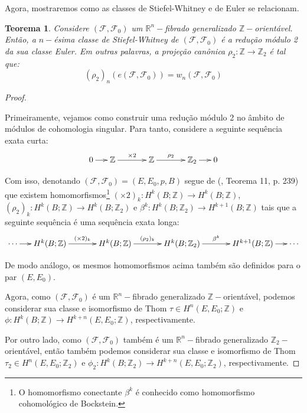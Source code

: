 \documentclass[12pt,oneside]{book} %
\newtheorem{teo}    {\hspace{0.5cm}Teorema}[chapter]
\newcommand{\R}{\mathbb{R}}
\newcommand{\Z}{\mathbb{Z}}
\begin{document}
\par Agora, mostraremos como as classes de Stiefel-Whitney e de Euler se relacionam.

\begin{teo}\label{euler_sw}
	Considere $(\mathcal{F},\mathcal{F}_{0})$ um $\R^{n}-$fibrado generalizado $\Z-$orientável. Então, a $n-$ésima classe de Stiefel-Whitney de $(\mathcal{F},\mathcal{F}_{0})$ é a redução módulo 2 da sua classe Euler. Em outras palavras, a projeção canônica $\rho_{2}:\Z\to\Z_{2}$ é tal que:
	$$ (\rho_{2})_{n}(e(\mathcal{F},\mathcal{F}_{0}))=w_{n}(\mathcal{F},\mathcal{F}_{0}) $$
\end{teo}

\begin{proof}
	
	\
	
	\par Primeiramente, vejamos como construir uma redução módulo 2 no âmbito de módulos de cohomologia singular. Para tanto, considere a seguinte sequência exata curta:
	$$ \xymatrix @C=0.5cm { 0\ar[r] & \Z \ar[rr]^-{\times 2} && \Z \ar[rr]^-{\rho_{2}} && \Z_{2} \ar[r] & 0 } $$
	
	\par Com isso, denotando $(\mathcal{F},\mathcal{F}_{0})=(E,E_{0},p,B)$ segue de (\cite{spanier}, Teorema 11, p. 239) que existem homomorfismos\footnote{O homomorfismo conectante $\beta^{k}$ é conhecido como homomorfismo cohomológico de Bockstein.} $(\times 2)_{k}:H^{k}(B;\Z)\to H^{k}(B;\Z)$, $(\rho_{2})_{k}:H^{k}(B;\Z)\to H^{k}(B;\Z_{2})$ e $\beta^{k}:H^{k}(B;\Z_{2})\to H^{k+1}(B;\Z)$ tais que a seguinte sequência é uma sequência exata longa:
	$$ \xymatrix @C=0.5cm { \cdots \ar[r] & H^{k}(B;\Z) \ar[rr]^-{(\times 2)_{k}} && H^{k}(B;\Z) \ar[rr]^-{(\rho_{2})_{k}} && H^{k}(B;\Z_{2}) \ar[rr]^-{\beta^{k}} && H^{k+1}(B;\Z) \ar[r] & \cdots } $$
	
	\par De modo análogo, os mesmos homomorfismos acima também são definidos para o par $(E,E_{0})$.
	
	\par Agora, como $(\mathcal{F},\mathcal{F}_{0})$ é um $\R^{n}-$fibrado generalizado $\Z-$orientável, podemos considerar sua classe e isomorfismo de Thom $\tau\in H^{n}(E,E_{0};\Z)$ e $\phi:H^{k}(B;\Z)\to H^{k+n}(E,E_{0};\Z)$, respectivamente.
	
	\par Por outro lado, como $(\mathcal{F},\mathcal{F}_{0})$ também é um $\R^{n}-$fibrado generalizado $\Z_{2}-$orientável, então também podemos considerar sua classe e isomorfismo de Thom $\tau_{2}\in H^{n}(E,E_{0};\Z_{2})$ e $\phi_{2}:H^{k}(B;\Z_{2})\to H^{k+n}(E,E_{0};\Z_{2})$, respectivamente.
	

\end{proof}
\end{document}

